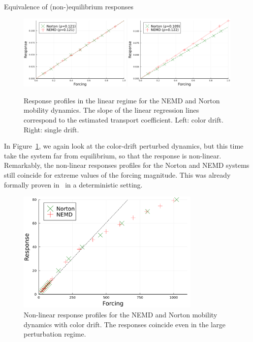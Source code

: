 \begin{subsection}{Equivalence of (non-)equilibrium responses}
        \begin{figure}
        \centering
        \includegraphics[width=0.49\textwidth]{figures/04/joint_color_drift_lin.pdf}
        \includegraphics[width=0.49\textwidth]{figures/04/joint_single_drift_lin.pdf}
    \caption[]{Response profiles in the linear regime for the NEMD and Norton mobility dynamics. The slope of the linear regression lines correspond to the estimated transport coefficient. Left: color drift. Right: single drift.}
    \end{figure}
    \label{04:fig:mobility_linear}

    In Figure~\ref{04:fig:mobility_non_linear}, we again look at the color-drift perturbed dynamics, but this time take the system far from equilibrium, so that the response is non-linear. Remarkably, the non-linear responses profiles for the Norton and NEMD systems still coincide for extreme values of the forcing magnitude. This was already formally proven in~\cite{E93} in a deterministic setting.
        \begin{figure}
        \centering
        \includegraphics[width=0.8\textwidth]{figures/04/joint_color_drift_nonlin.pdf}
        \caption[]{Non-linear response profiles for the NEMD and Norton mobility dynamics with color drift. The responses coincide even in the large perturbation regime.}
        \label{04:fig:mobility_non_linear}
    \end{figure}


\end{subsection}
